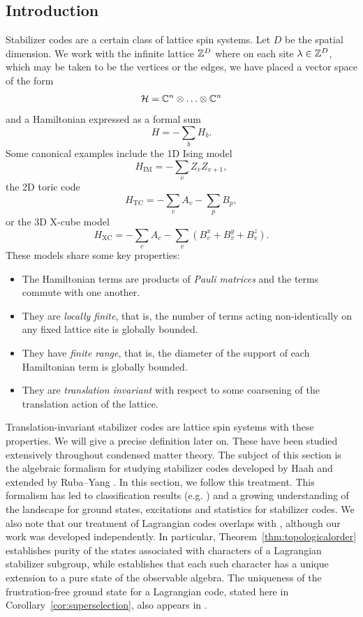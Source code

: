 \documentclass[11pt]{amsart}
\begin{document}
\subsection{Introduction}
Stabilizer codes are a certain class of lattice spin systems. Let $D$ be the spatial dimension. We work with the infinite lattice $\mathbb{Z}^D$ where on each site $\lambda \in \mathbb{Z}^D$, which may be taken to be the vertices or the edges, we have placed a vector space of the form
\[\mathcal{H} = \mathbb{C}^n \otimes \ldots \otimes \mathbb{C}^n\]
and a Hamiltonian expressed as a formal sum
\[ H =- \sum_b H_b.\]
Some canonical examples include the 1D Ising model
\[ H_{\mathrm{IM}} =- \sum_{v} Z_vZ_{v+1},\]
the 2D toric code
\[ H_{\mathrm{TC}} =- \sum_{v} A_v -\sum_p B_p, \]
or
 the 3D X-cube model
\[ H_{\mathrm{XC}} =- \sum_{c} A_c -\sum_v (B_v^x +B_v^y+B_v^z). \]
These models share some key properties:
\begin{itemize}
\item The Hamiltonian terms are products of \emph{Pauli matrices} and the terms commute with one another.
\item They are \emph{locally finite}, that is,  the number of terms acting non-identically on any fixed lattice site is globally bounded.
\item They have \emph{finite range}, that is, the diameter of the support of each Hamiltonian term is globally bounded.
\item They are \emph{translation invariant} with respect to some coarsening of the translation action of the lattice.
\end{itemize}
Translation-invariant stabilizer codes are lattice spin systems with these properties. We will give a precise definition later on. These have been studied extensively throughout condensed matter theory. The subject of this section is the algebraic formalism for studying stabilizer codes developed by Haah \cite{HaahCommuting} and extended by Ruba--Yang \cite{RYHomological}. In this section, we follow this treatment. This formalism has led to classification results (e.g. \cite{HaahCommuting, HaahClassification, HFH, RYWitt}) and a growing understanding of the landscape for ground states, excitations and statistics for stabilizer codes.  We also note that our treatment of Lagrangian codes overlaps with \cite{cheng_higson_polo_ojito_prodan_2026}, although our work was developed independently. In particular, Theorem~\ref{thm:topologicalorder} establishes purity of the states associated with characters of a Lagrangian stabilizer subgroup, while \cite[Theorem~3.4]{cheng_higson_polo_ojito_prodan_2026} establishes that each such character has a unique extension to a pure state of the observable algebra. The uniqueness of the frustration-free ground state for a Lagrangian code, stated here in Corollary~\ref{cor:superselection}, also appears in \cite[Corollary~3.5]{cheng_higson_polo_ojito_prodan_2026}.
\end{document}
